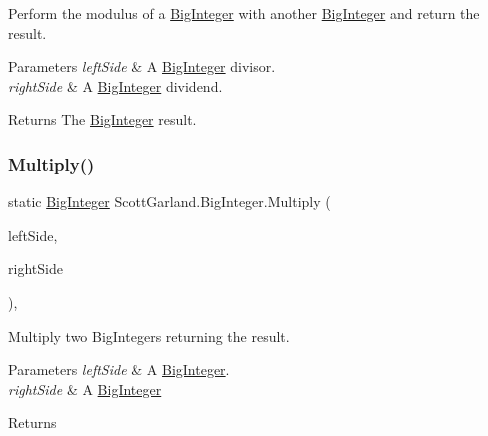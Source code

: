 Perform the modulus of a \hyperlink{class_scott_garland_1_1_big_integer}{Big\+Integer} with another \hyperlink{class_scott_garland_1_1_big_integer}{Big\+Integer} and return the result. 


\begin{DoxyParams}{Parameters}
{\em left\+Side} & A \hyperlink{class_scott_garland_1_1_big_integer}{Big\+Integer} divisor.\\
\hline
{\em right\+Side} & A \hyperlink{class_scott_garland_1_1_big_integer}{Big\+Integer} dividend.\\
\hline
\end{DoxyParams}
\begin{DoxyReturn}{Returns}
The \hyperlink{class_scott_garland_1_1_big_integer}{Big\+Integer} result.
\end{DoxyReturn}
\mbox{\label{class_scott_garland_1_1_big_integer_a003b5c4564964f03ffa49a74bad0f4fd}} 
\subsubsection{\texorpdfstring{Multiply()}{Multiply()}}
{\footnotesize\ttfamily static \hyperlink{class_scott_garland_1_1_big_integer}{Big\+Integer} Scott\+Garland.\+Big\+Integer.\+Multiply (\begin{DoxyParamCaption}\item[{\hyperlink{class_scott_garland_1_1_big_integer}{Big\+Integer}}]{left\+Side,  }\item[{\hyperlink{class_scott_garland_1_1_big_integer}{Big\+Integer}}]{right\+Side }\end{DoxyParamCaption})\hspace{0.3cm}{\ttfamily [inline]}, {\ttfamily [static]}}



Multiply two Big\+Integers returning the result. 


\begin{DoxyParams}{Parameters}
{\em left\+Side} & A \hyperlink{class_scott_garland_1_1_big_integer}{Big\+Integer}.\\
\hline
{\em right\+Side} & A \hyperlink{class_scott_garland_1_1_big_integer}{Big\+Integer}\\
\hline
\end{DoxyParams}
\begin{DoxyReturn}{Returns}

\end{DoxyReturn}
\mbox{\label{class_scott_garland_1_1_big_integer_a91144e3aedfda684b3d5e5cdb4b86cbb}} 
